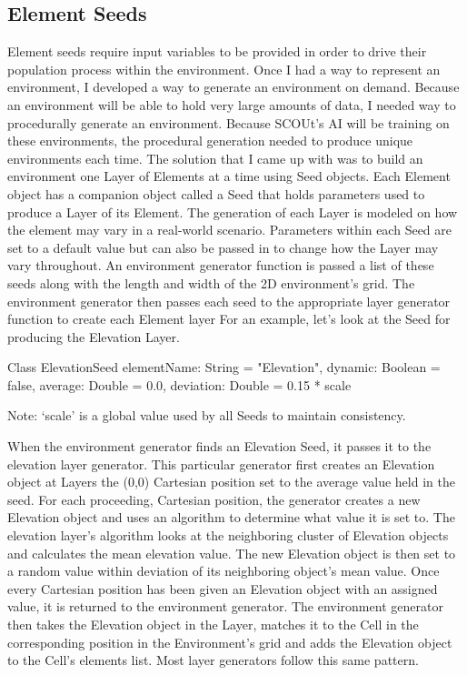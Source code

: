 \subsection{Element Seeds}
Element seeds require input variables to be provided in order to drive their population process within the environment.
Once I had a way to represent an environment, I developed a way to generate an environment on demand.
Because an environment will be able to hold very large amounts of data, I needed way to procedurally generate an environment.
Because SCOUt’s AI will be training on these environments, the procedural generation needed to produce unique environments each time.
The solution that I came up with was to build an environment one Layer of Elements at a time using Seed objects.
Each Element object has a companion object called a Seed that holds parameters used to produce a Layer of its Element.
The generation of each Layer is modeled on how the element may vary in a real-world scenario.
Parameters within each Seed are set to a default value but can also be passed in to change how the Layer may vary throughout.
An environment generator function is passed a list of these seeds along with the length and width of the 2D environment’s grid.
The environment generator then passes each seed to the appropriate layer generator function to create each Element layer
For an example, let’s look at the Seed for producing the Elevation Layer.

Class ElevationSeed {
	elementName: String = "Elevation",
    	dynamic: Boolean = false,
    	average: Double = 0.0,
    	deviation: Double = 0.15 * scale
}

Note: ‘scale’ is a global value used by all Seeds to maintain consistency.

When the environment generator finds an Elevation Seed, it passes it to the elevation layer generator.
This particular generator first creates an Elevation object at Layers the (0,0) Cartesian position set to the average value held in the seed.
For each proceeding, Cartesian position, the generator creates a new Elevation object and uses an algorithm to determine what value it is set to.
The elevation layer’s algorithm looks at the neighboring cluster of Elevation objects and calculates the mean elevation value.
The new Elevation object is then set to a random value within deviation of its neighboring object’s mean value.
Once every Cartesian position has been given an Elevation object with an assigned value, it is returned to the environment generator.
The environment generator then takes the Elevation object in the Layer, matches it to the Cell in the corresponding position in the Environment’s grid and adds the Elevation object to the Cell’s elements list.
Most layer generators follow this same pattern.


